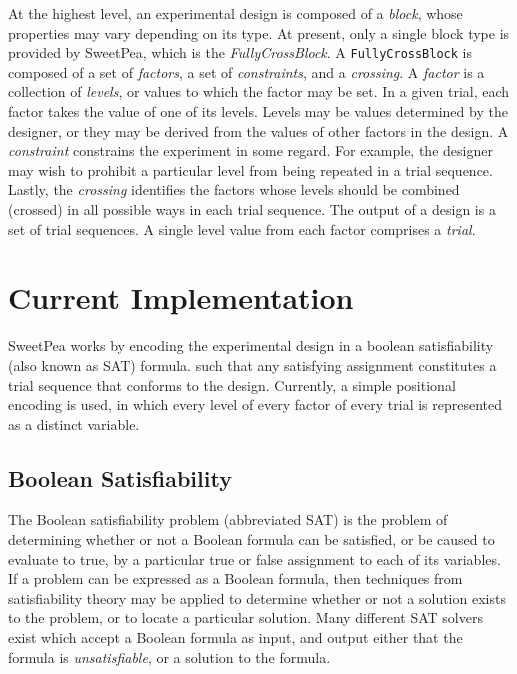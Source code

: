 At the highest level, an experimental design is composed of a \textit{block}, whose properties may vary depending on its type. At present, only a single block type is provided by SweetPea, which is the \textit{FullyCrossBlock}. A \texttt{FullyCrossBlock} is composed of a set of \textit{factors}, a set of \textit{constraints}, and a \textit{crossing}. A \textit{factor} is a collection of \textit{levels}, or values to which the factor may be set. In a given trial, each factor takes the value of one of its levels. Levels may be values determined by the designer, or they may be derived from the values of other factors in the design. A \textit{constraint} constrains the experiment in some regard. For example, the designer may wish to prohibit a particular level from being repeated in a trial sequence. Lastly, the \textit{crossing} identifies the factors whose levels should be combined (crossed) in all possible ways in each trial sequence. The output of a design is a set of trial sequences. A single level value from each factor comprises a \textit{trial}.


\section{Current Implementation}

SweetPea works by encoding the experimental design in a boolean satisfiability (also known as SAT) formula. such that any satisfying assignment constitutes a trial sequence that conforms to the design. Currently, a simple positional encoding is used, in which every level of every factor of every trial is represented as a distinct variable.

\subsection{Boolean Satisfiability}

The Boolean satisfiability problem (abbreviated SAT) is the problem of determining whether or not a Boolean formula can be satisfied, or be caused to evaluate to true, by a particular true or false assignment to each of its variables. If a problem can be expressed as a Boolean formula, then techniques from satisfiability theory may be applied to determine whether or not a solution exists to the problem, or to locate a particular solution. Many different SAT solvers exist which accept a Boolean formula as input, and output either that the formula is \textit{unsatisfiable}, or a solution to the formula.

